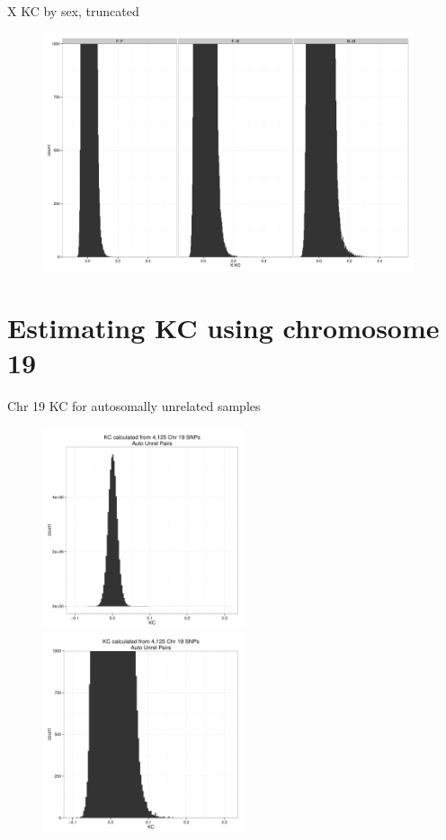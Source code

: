 \documentclass{beamer}
\begin{document}
\begin{frame}{X KC by sex, truncated}
\begin{figure}
\includegraphics[height=7cm]{xkc_unrel_hist_bySexPair_trunc.pdf}
\end{figure}
\end{frame}

\section[]{Estimating KC using chromosome 19}
\begin{frame}{Chr 19 KC for autosomally unrelated samples}
\begin{figure}
\includegraphics[height=5.9cm]{kc_chr19_autounrel_hist.pdf}
\includegraphics[height=5.9cm]{kc_chr19_autounrel_hist_trunc.pdf}
\end{figure}
\end{frame}
\end{document}
